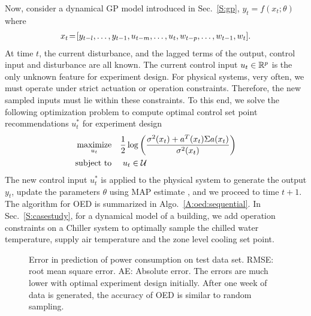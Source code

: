 Now, consider a dynamical GP model introduced in Sec.~\ref{S:gp},
\begin{math}
y_{t} = f(x_t;\theta)
\end{math}
where
\begin{align}
x_{t}\!=\![y_{t-l}, \dots, y_{t-1}, u_{t-m}, \dots, u_t, w_{t-p}, \dots, w_{t-1}, w_t] \text.
\label{E:GP:features}
\end{align}
At time \(t\), the current disturbance, and the lagged terms of the output, control input and disturbance are all known. The current control input \(u_t \in \mathbb{R}^p \) is the only unknown feature for experiment design. For physical systems, very often, we must operate under strict actuation or operation constraints. Therefore, the new sampled inputs must lie within these constraints. To this end, we solve the following optimization problem to compute optimal control set point recommendations \(u^*_t\) for experiment design
\begin{align}
\label{E:oed:sampling}
\maximize_{u_{t}} & \ \ \ \frac{1}{2}\log\left(\frac{\sigma^2(x_t)+a^T(x_t)\Sigma a(x_t)}{\sigma^2(x_t)}\right) \\
\st &  \ \ \ \   u_t \in \mathcal{U} \nonumber
\end{align}
The new control input \(u^*_t\) is applied to the physical system to generate the output \(y_t\), update the parameters \(\theta\) using MAP estimate \cite{Garnett2013}, and we proceed to time \(t+1\). 
The algorithm for OED is summarized in Algo.~\ref{A:oed:sequential}.
In Sec.~\ref{S:casestudy}, for a dynamical model of a building, we add operation constraints on a Chiller system to optimally sample the chilled water temperature, supply air temperature and the zone level cooling set point. 


\begin{figure}[!tb]
	\centering
	\setlength{}
	\setlength{}	
	
	\caption{Error in prediction of power consumption on test data set. RMSE: root mean square error. AE: Absolute error. The errors are much lower with optimal experiment design initially. After one week of data is generated, the accuracy of OED is similar to random sampling.}
	\captionsetup{justification=centering}
	\label{F:oed-acc}
\end{figure}
